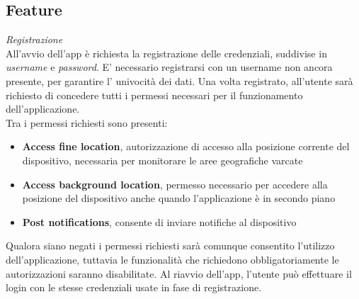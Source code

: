 \documentclass{article}
\begin{document}
\subsection*{Feature}
\textit{Registrazione} \vspace*{7pt}\\
All'avvio dell'app è richiesta la registrazione delle credenziali, suddivise in \textit{username} e \textit{password}. E' necessario registrarsi con un username non ancora presente, per garantire l' univocità dei dati. Una volta registrato, all'utente sarà richiesto di concedere tutti i permessi necessari per il funzionamento dell'applicazione. \\
Tra i permessi richiesti sono presenti:
\begin{itemize}
    \renewcommand{\labelitemi}{-}
    \item \textbf{Access fine location}, autorizzazione di accesso alla posizione corrente del dispositivo, necessaria per monitorare le aree geografiche varcate
    \item \textbf{Access background location}, permesso necessario per accedere alla posizione del dispositivo anche quando l'applicazione è in secondo piano
    \item \textbf{Post notifications}, consente di inviare notifiche al dispositivo
\end{itemize}
Qualora siano negati i permessi richiesti sarà comunque consentito l'utilizzo dell'applicazione, tuttavia le funzionalità che richiedono obbligatoriamente le autorizzazioni saranno disabilitate.
Al riavvio dell'app, l'utente può effettuare il login con le stesse credenziali usate in fase di registrazione. \vspace*{7pt}\\
\end{document}
